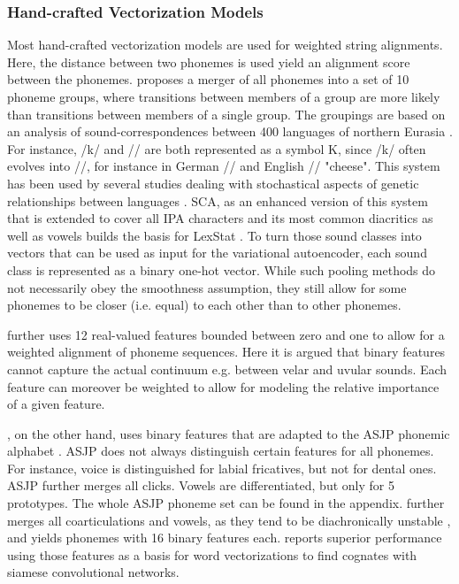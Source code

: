\documentclass[6pt]{article}
\begin{document}
\subsubsection{Hand-crafted Vectorization Models}
\label{Hand-crafted Vectorization Models}
Most hand-crafted vectorization models are used for weighted string alignments. Here, the distance between two phonemes is used yield an alignment score between the phonemes. \cite{dolgopolsky1986probabilistic} proposes a merger of all phonemes into a set of 10 phoneme groups, where transitions between  members of a group are more likely than transitions between members of a single group. The groupings are based on an analysis of sound-correspondences between 400 languages of northern Eurasia \citep[p. 119]{list2012lexstat}. For instance, /k/ and // are both represented as a symbol K, since /k/ often evolves into //, for instance in German // and English // "cheese". This system has been used by several studies dealing with stochastical aspects of genetic relationships between languages \citep{baxter2000beyond,mortarino2009improved,turchin2010analyzing}. SCA, as an enhanced version of this system that is extended to cover all IPA characters and its most common diacritics as well as vowels builds the basis for LexStat \citep{list2012lexstat,list2012sca}. To turn those sound classes into vectors that can be used as input for the variational autoencoder, each sound class is represented as a binary one-hot vector. While such pooling methods do not necessarily obey the smoothness assumption, they still allow for some phonemes to be closer (i.e. equal) to each other than to other phonemes. 

 \cite{kondrak2000new} further uses 12 real-valued features bounded between zero and one to allow for a weighted alignment of phoneme sequences. Here it is argued that binary features cannot capture the actual continuum e.g. between velar and uvular sounds. Each feature can moreover be weighted to allow for modeling the relative importance of a given feature.


\cite{rama2016siamese}, on the other hand,  uses binary features that are adapted to the ASJP phonemic alphabet  \citep{wichmann2010asjp}. ASJP does not always distinguish certain features for all phonemes. For instance, voice is distinguished for labial fricatives, but not for dental ones. ASJP further merges all clicks. Vowels are differentiated, but only for 5 prototypes. The whole ASJP phoneme set can be found in the appendix. \cite{rama2016siamese} further merges all coarticulations and vowels, as they tend to be diachronically unstable \citep{kessler2007word}, and yields phonemes with 16 binary features each. \cite{rama2016siamese} reports superior performance using those features as a basis for word vectorizations to find cognates with siamese convolutional networks.
\end{document}

